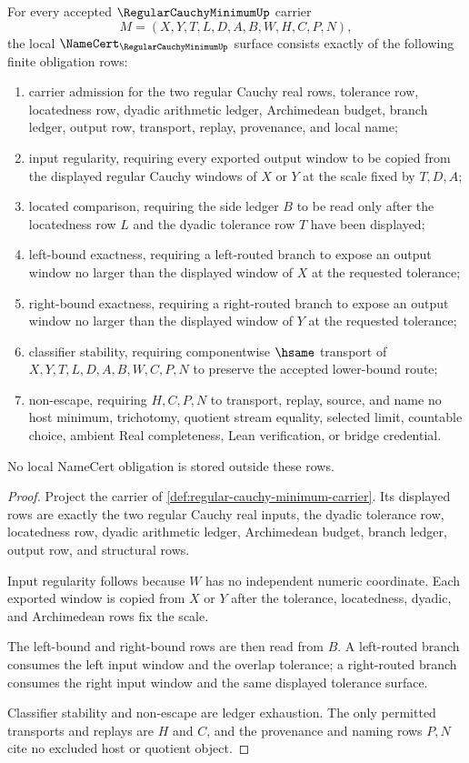 \begin{theorem}\label{thm:regular-cauchy-minimum-namecert-obligations}
For every accepted $\RegularCauchyMinimumUp$ carrier
$$
M=(X,Y,T,L,D,A,B,W,H,C,P,N),
$$
the local $\NameCert_{\RegularCauchyMinimumUp}$ surface consists exactly of the following finite obligation rows:
\begin{enumerate}
\item carrier admission for the two regular Cauchy real rows, tolerance row, locatedness row, dyadic arithmetic ledger, Archimedean budget, branch ledger, output row, transport, replay, provenance, and local name;
\item input regularity, requiring every exported output window to be copied from the displayed regular Cauchy windows of $X$ or $Y$ at the scale fixed by $T,D,A$;
\item located comparison, requiring the side ledger $B$ to be read only after the locatedness row $L$ and the dyadic tolerance row $T$ have been displayed;
\item left-bound exactness, requiring a left-routed branch to expose an output window no larger than the displayed window of $X$ at the requested tolerance;
\item right-bound exactness, requiring a right-routed branch to expose an output window no larger than the displayed window of $Y$ at the requested tolerance;
\item classifier stability, requiring componentwise $\hsame$ transport of $X,Y,T,L,D,A,B,W,C,P,N$ to preserve the accepted lower-bound route;
\item non-escape, requiring $H,C,P,N$ to transport, replay, source, and name no host minimum, trichotomy, quotient stream equality, selected limit, countable choice, ambient Real completeness, Lean verification, or bridge credential.
\end{enumerate}
No local NameCert obligation is stored outside these rows.
\end{theorem}
\begin{proof}
Project the carrier of \autoref{def:regular-cauchy-minimum-carrier}. Its displayed rows are exactly the two regular Cauchy real inputs, the dyadic tolerance row, locatedness row, dyadic arithmetic ledger, Archimedean budget, branch ledger, output row, and structural rows.

Input regularity follows because $W$ has no independent numeric coordinate. Each exported window is copied from $X$ or $Y$ after the tolerance, locatedness, dyadic, and Archimedean rows fix the scale.

The left-bound and right-bound rows are then read from $B$. A left-routed branch consumes the left input window and the overlap tolerance; a right-routed branch consumes the right input window and the same displayed tolerance surface.

Classifier stability and non-escape are ledger exhaustion. The only permitted transports and replays are $H$ and $C$, and the provenance and naming rows $P,N$ cite no excluded host or quotient object.
\end{proof}

